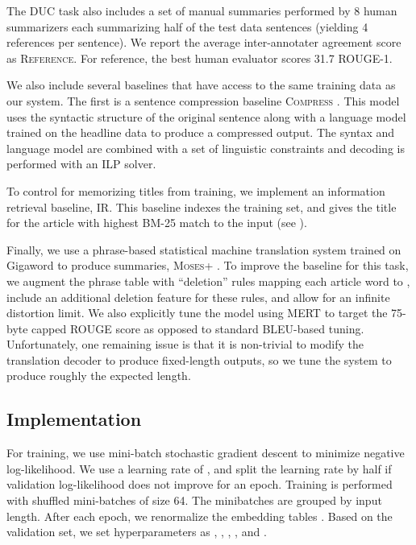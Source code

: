 \documentclass[11pt,a4paper]{article}
\begin{document}
The DUC task also includes a set of manual summaries performed by 8
human summarizers each summarizing half of the test data sentences (yielding 4 references per sentence). We report the
average inter-annotater agreement score as \textsc{Reference}. For reference, the best human evaluator scores 31.7 ROUGE-1.

We also include several baselines that have access to the same
training data as our system. The first is a sentence compression
baseline \textsc{Compress} \cite{clarke2008global}. This model uses
the syntactic structure of the original sentence along with a language
model trained on the headline data to produce a compressed output.  The syntax and language model
are combined with a set of linguistic constraints and decoding is performed with an ILP solver. 



To control for memorizing titles from training, we implement an
information retrieval baseline, \textsc{IR}. This baseline indexes the
training set, and gives the title for the article with highest
BM-25 match to the input (see ).

Finally, we use a   phrase-based statistical machine translation system trained on Gigaword
to produce summaries, \textsc{Moses+} \cite{koehn2007moses}. To improve the baseline for this task, we augment the phrase table
with ``deletion'' rules mapping each article word to ,
include an additional deletion feature for these rules, and allow for an
infinite distortion limit. We also explicitly tune the model using
MERT to target the 75-byte capped ROUGE score as opposed to standard
BLEU-based tuning. Unfortunately, one remaining issue is that it is non-trivial to modify the translation decoder to produce fixed-length outputs, so we tune the system to produce roughly the expected length.


\subsection{Implementation}

For training, we use mini-batch stochastic gradient descent to
minimize negative log-likelihood. We use a learning rate of ,
and split the learning rate by half if validation log-likelihood does
not improve for an epoch. Training is performed with shuffled
mini-batches of size 64. The minibatches are grouped by input
length. After each epoch, we renormalize the embedding tables \cite{hinton2012improving}. Based on the
validation set, we set hyperparameters as , , ,
, and .
\end{document}
